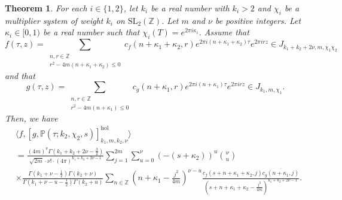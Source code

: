 \documentclass[11pt]{amsart}
\newtheorem{thm}{Theorem}[section]
\theoremstyle{definition}
\theoremstyle{remark}
\numberwithin{equation}{section}
\renewcommand{\(}{\left(}
\renewcommand{\)}{\right)}
\begin{document}
\begin{thm}\label{thm 9}
    For each $i\in \{1,2\}$, let $k_i$ be a real number with $k_i>2$ and $\chi_i$ be a multiplier system of weight $k_i$ on $\mathrm{SL}_{2}(\mathbb{Z})$.
    Let $m$ and $\nu$ be positive integers. 
    Let $\kappa_i\in [0,1)$ be a real number such that $\chi_{i}(T)=e^{2\pi i \kappa_i}$.
    Assume that 
    \[ f(\tau,z)=\sum_{\substack{n,r\in \mathbb{Z}\\r^2-4m(n+\kappa_1+\kappa_2)\leq 0}} c_{f}(n+\kappa_1+\kappa_2,r) e^{2\pi i (n+\kappa_1+\kappa_2)\tau}e^{2\pi i r z}\in J_{k_1+k_2+2\nu,m,\chi_1\chi_2} \]
    and that
    \[ g(\tau,z)=\sum_{\substack{n,r\in \mathbb{Z}\\r^2-4m(n+\kappa_1)\leq 0}} c_{g}(n+\kappa_1,r) e^{2\pi i (n+\kappa_1)\tau}e^{2\pi i r z}\in J_{k_1,m,\chi_1}. \]
    Then, we have 
    \begin{equation*}
        \begin{aligned}
            &\langle f, [g,\mathbb{P}(\tau;k_2,\chi_2,s)]_{k_1,m,k_2,\nu}^{\mathrm{hol}} \rangle\\
            &=\frac{(4m)^{\nu}\Gamma(k_1+k_2+2\nu-\frac{3}{2})}{\sqrt{2m}\cdot \nu!\cdot (4\pi)^{k_1+k_2+2\nu-1}}\sum_{j=1}^{2m}\sum_{u=0}^{\nu} (-(s+\kappa_{2}))^{u}\binom{\nu}{u}\\
            &\times\frac{\Gamma(k_1+\nu-\frac{1}{2})\Gamma(k_2+\nu)}{\Gamma(k_1+\nu-u-\frac{1}{2})\Gamma(k_2+u)}\sum_{n\in \mathbb{Z}} \left(n+\kappa_{1}-\frac{j^2}{4m}\right)^{\nu-u}\frac{c_{f}(s+n+\kappa_{1}+\kappa_{2},j)\overline{c_g(n+\kappa_{1},j)}}{\left(s+n+\kappa_{1}+\kappa_{2}-\frac{j^2}{4m}\right)^{k_1+k_2+2\nu-1}}.
        \end{aligned}
    \end{equation*}
\end{thm}
\end{document}

